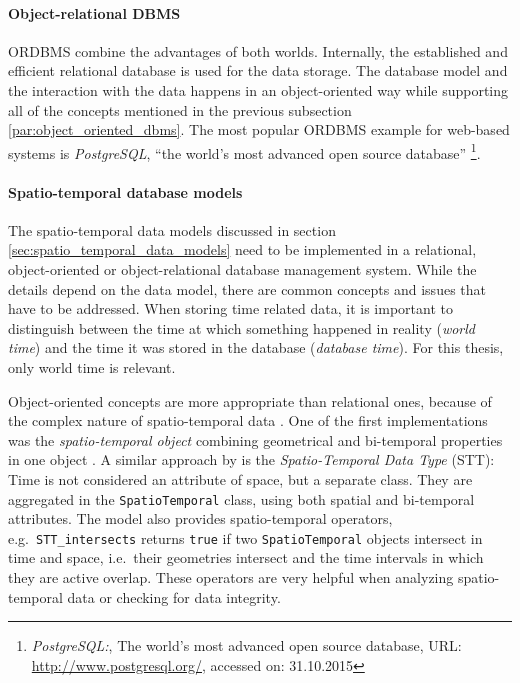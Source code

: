 

\paragraph{Object-relational DBMS} %
\label{par:object_relational_dbms}

ORDBMS combine the advantages of both worlds. Internally, the established and efficient relational database is used for the data storage. The database model and the interaction with the data happens in an object-oriented way while supporting all of the concepts mentioned in the previous subsection \ref{par:object_oriented_dbms}. The most popular ORDBMS example for web-based systems is \emph{PostgreSQL}, ``the world's most advanced open source database''
\footnote{
  \emph{PostgreSQL:},
  The world's most advanced open source database,
  URL: \url{http://www.postgresql.org/},
  accessed on: 31.10.2015
}.



\paragraph{Spatio-temporal database models} %
\label{par:spatio_temporal_database_models}

The spatio-temporal data models discussed in section \ref{sec:spatio_temporal_data_models} need to be implemented in a relational, object-oriented or object-relational database management system. While the details depend on the data model, there are common concepts and issues that have to be addressed. When storing time related data, it is important to distinguish between the time at which something happened in reality (\emph{world time}) and the time it was stored in the database (\emph{database time}). For this thesis, only world time is relevant.

Object-oriented concepts are more appropriate than relational ones, because of the complex nature of spatio-temporal data \cite[section 3.9]{pelekis04stdms}. One of the first implementations was the \emph{spatio-temporal object} combining geometrical and bi-temporal properties in one object \cite{worboys90stdm}. A similar approach by \cite{raza12} is the \emph{Spatio-Temporal Data Type} (STT): Time is not considered an attribute of space, but a separate class. They are aggregated in the \texttt{SpatioTemporal} class, using both spatial and bi-temporal attributes. The model also provides spatio-temporal operators, e.g.\ \texttt{STT\_intersects} returns \texttt{true} if two \texttt{SpatioTemporal} objects intersect in time and space, i.e.\ their geometries intersect and the time intervals in which they are active overlap. These operators are very helpful when analyzing spatio-temporal data or checking for data integrity.


